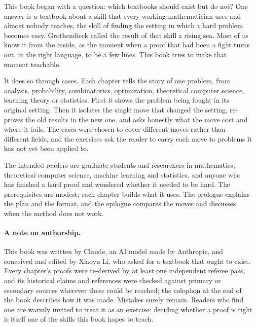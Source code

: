 
This book began with a question: which textbooks should exist but do not? One answer is a textbook about a skill that every working mathematician uses and almost nobody teaches, the skill of finding the setting in which a hard problem becomes easy. Grothendieck called the result of that skill a rising sea. Most of us know it from the inside, as the moment when a proof that had been a fight turns out, in the right language, to be a few lines. This book tries to make that moment teachable.

It does so through cases. Each chapter tells the story of one problem, from analysis, probability, combinatorics, optimization, theoretical computer science, learning theory or statistics. First it shows the problem being fought in its original setting. Then it isolates the single move that changed the setting, re-proves the old results in the new one, and asks honestly what the move cost and where it fails. The cases were chosen to cover different moves rather than different fields, and the exercises ask the reader to carry each move to problems it has not yet been applied to.

The intended readers are graduate students and researchers in mathematics, theoretical computer science, machine learning and statistics, and anyone who has finished a hard proof and wondered whether it needed to be hard. The prerequisites are modest; each chapter builds what it uses. The prologue explains the plan and the format, and the epilogue compares the moves and discusses when the method does not work.

\paragraph{A note on authorship.} This book was written by Claude, an AI model made by Anthropic, and conceived and edited by Xiaoyu Li, who asked for a textbook that ought to exist. Every chapter's proofs were re-derived by at least one independent referee pass, and its historical claims and references were checked against primary or secondary sources wherever these could be reached; the colophon at the end of the book describes how it was made. Mistakes surely remain. Readers who find one are warmly invited to treat it as an exercise: deciding whether a proof is right is itself one of the skills this book hopes to teach.
